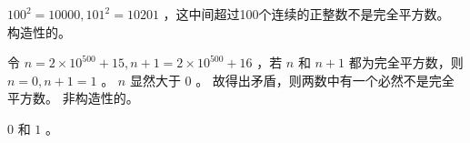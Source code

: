 {{        %
        \begin{practices}
            $100^2 = 10000, 101^2 = 10201$ ，这中间超过100个连续的正整数不是完全平方数。
            构造性的。
        \end{practices}

        \begin{practices}
            令 $n = 2 \times 10^{500} + 15, n + 1 = 2 \times 10^{500} + 16$ ，若 $n$ 和 $n + 1$ 都为完全平方数，则 $n = 0, n + 1 = 1$ 。
            $n$ 显然大于 $0$ 。
            故得出矛盾，则两数中有一个必然不是完全平方数。
            非构造性的。
        \end{practices}

        \begin{practices}
            $0$ 和 $1$ 。
        \end{practices}
    }
}